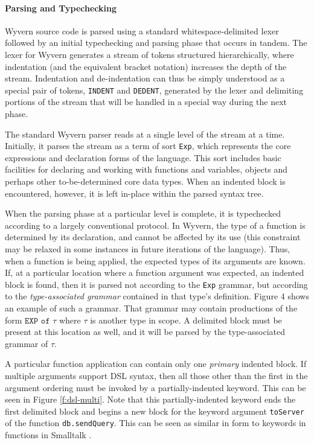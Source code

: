\paragraph{Parsing and Typechecking}
Wyvern source code is parsed using a standard whitespace-delimited lexer followed by an initial typechecking and parsing phase that occurs in tandem.  The lexer for Wyvern generates a stream of tokens structured hierarchically, where indentation (and the equivalent bracket notation) increases the depth of the stream. Indentation and de-indentation can thus be simply  understood as a special pair of tokens, \texttt{INDENT} and \texttt{DEDENT}, generated by the lexer and delimiting portions of the stream that will be handled in a special way during the next phase.

The standard Wyvern parser reads at a single level of the stream at a time. Initially, it parses the stream as a term of sort \verb|Exp|, which represents the core expressions and declaration forms of the language. This sort includes basic facilities for declaring and working with functions and variables, objects and perhaps other to-be-determined core data types. When an indented block is encountered, however, it is left in-place within the parsed syntax tree. 

When the parsing phase at a particular level is complete, it is typechecked according to a largely conventional protocol. In Wyvern, the type of a function is determined by its declaration, and cannot be affected by its use (this constraint may be relaxed in some instances in future iterations of the language). Thus, when a function is being applied, the expected types of its arguments are known. If, at a particular location where a function argument was expected, an indented block is found, then it is parsed not according to the \verb|Exp| grammar, but according to the \emph{type-associated grammar} contained in that type's definition. Figure 4 shows an example of such a grammar. That grammar may contain productions of the form $\texttt{EXP of }\tau$ where $\tau$ is another type in scope. A delimited block must be present at this location as well, and it will be parsed by the type-associated grammar of $\tau$.

A particular function application can contain only one \emph{primary} indented block. If multiple arguments support DSL syntax, then all those other than the first in the argument ordering must be invoked by a partially-indented keyword. This can be seen in Figure \ref{f:dsl-multi}. Note that this partially-indented keyword ends the first delimited block and begins a new block for the keyword argument \verb|toServer| of the function \verb|db.sendQuery|. This can be seen as similar in form to keywords in functions in Smalltalk \cite{smalltalk}.

